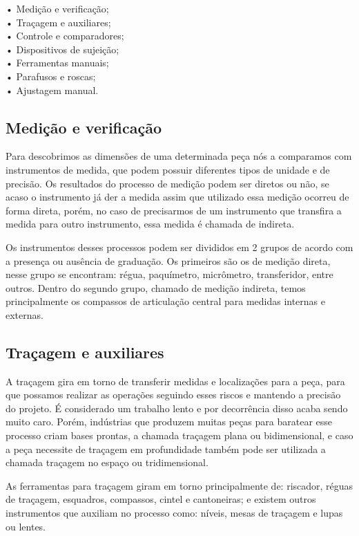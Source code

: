 \documentclass[
	12pt,				%
	oneside,			%
	a4paper,			%
	english,			%
	french,				%
	spanish,			%
	brazil,				%
	]{abntex2}
\begin{document}
\begin{center}
•	Medição e verificação;\\
•	Traçagem e auxiliares;\\
•	Controle e comparadores;\\
•	Dispositivos de sujeição;\\
•	Ferramentas manuais;\\
•	Parafusos e roscas;\\
•	Ajustagem manual.
\end{center}
\subsection{Medição e verificação}

Para descobrimos as dimensões de uma determinada peça nós a comparamos com instrumentos de medida, que podem possuir diferentes tipos de unidade e de precisão. Os resultados do processo de medição podem ser diretos ou não, se acaso o instrumento já der a medida assim que utilizado essa medição ocorreu de forma direta, porém, no caso de precisarmos de um instrumento que transfira a medida para outro instrumento, essa medida é chamada de indireta.

Os instrumentos desses processos podem ser divididos em 2 grupos de acordo com a presença ou ausência de graduação. Os primeiros são os de medição direta, nesse grupo se encontram: régua, paquímetro, micrômetro, transferidor, entre outros. Dentro do segundo grupo, chamado de medição indireta, temos principalmente os compassos de articulação central para medidas internas e externas.

\subsection{Traçagem e auxiliares}

A traçagem gira em torno de transferir medidas e localizações para a peça, para que possamos realizar as operações seguindo esses riscos e mantendo a precisão do projeto. É considerado um trabalho lento e por decorrência disso acaba sendo muito caro. Porém, indústrias que produzem muitas peças para baratear esse processo criam bases prontas, a chamada traçagem plana ou bidimensional, e caso a peça necessite de traçagem em profundidade também pode ser utilizada a chamada traçagem no espaço ou tridimensional.

As ferramentas para traçagem giram em torno principalmente de: riscador, réguas de traçagem, esquadros, compassos, cintel e cantoneiras; e existem outros instrumentos que auxiliam no processo como: níveis, mesas de traçagem e lupas ou lentes.
\end{document}
